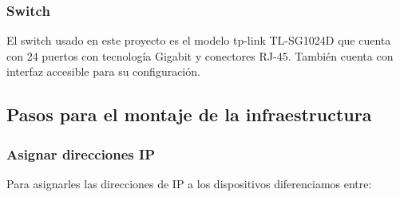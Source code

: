 \subsubsection{Switch}
El switch usado en este proyecto es el modelo tp-link TL-SG1024D que cuenta con 24 puertos con tecnología Gigabit y conectores RJ-45. También cuenta con interfaz accesible para su configuración.


\subsection{Pasos para el montaje de la infraestructura}
\subsubsection{Asignar direcciones IP}
Para asignarles las direcciones de IP a los dispositivos diferenciamos entre:
